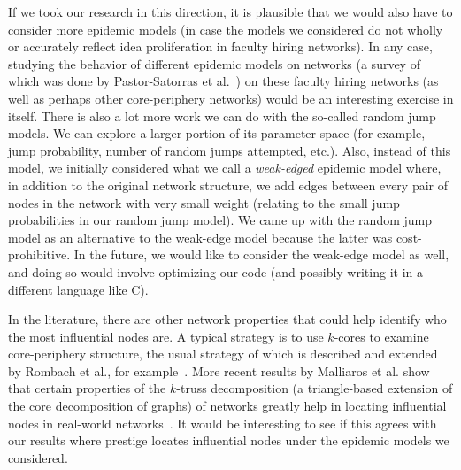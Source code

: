 \documentclass[%
 reprint,
 amsmath,amssymb,
 aps,
]{revtex4-1}
\begin{document}
If we took our research in this direction, it is plausible that we would also have to consider more epidemic models (in case the models we considered do not wholly or accurately reflect idea proliferation in faculty hiring networks). In any case, studying the behavior of different epidemic models on networks (a survey of which was done by Pastor-Satorras et al.~\cite{epidemicsurvey}) on these faculty hiring networks (as well as perhaps other core-periphery networks) would be an interesting exercise in itself. There is also a lot more work we can do with the so-called random jump models. We can explore a larger portion of its parameter space (for example, jump probability, number of random jumps attempted, etc.). Also, instead of this model, we initially considered what we call a \emph{weak-edged} epidemic model where, in addition to the original network structure, we add edges between every pair of nodes in the network with very small weight (relating to the small jump probabilities in our random jump model). We came up with the random jump model as an alternative to the weak-edge model because the latter was cost-prohibitive. In the future, we would like to consider the weak-edge model as well, and doing so would involve optimizing our code (and possibly writing it in a different language like C).

In the literature, there are other network properties that could help identify who the most influential nodes are. A typical strategy is to use $k$-cores to examine core-periphery structure, the usual strategy of which is described and extended by Rombach et al., for example~\cite{rombach:coreperiphery}. More recent results by Malliaros et al. show that certain properties of the $k$-truss decomposition (a triangle-based extension of the core decomposition of graphs) of networks greatly help in locating influential nodes in real-world networks~\cite{malliaros:influentialnodes}. It would be interesting to see if this agrees with our results where prestige locates influential nodes under the epidemic models we considered.
\end{document}
